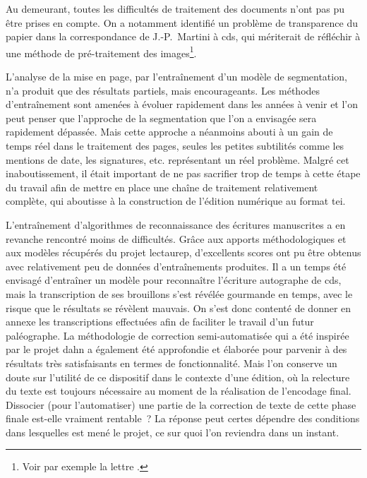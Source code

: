 \documentclass[a4paper,12pt,twoside]{book}
\begin{document}
		Au demeurant, toutes les difficultés de traitement des documents n'ont pas pu être prises en compte. On a notamment identifié un problème de transparence du papier dans la correspondance de J.-P.~Martini à \gls{cds}, qui mériterait de réfléchir à une méthode de pré-traitement des images\footnote{Voir par exemple la lettre \cite{CdS19054056}.}.
		
		L'analyse de la mise en page, par l'entraînement d'un modèle de \gls{segmentation}, n'a produit que des résultats partiels, mais encourageants. Les méthodes d'entraînement sont amenées à évoluer rapidement dans les années à venir et l'on peut penser que l'approche de la \gls{segmentation} que l'on a envisagée sera rapidement dépassée. Mais cette approche a néanmoins abouti à un gain de temps réel dans le traitement des pages, seules les petites subtilités comme les mentions de date, les signatures, etc. représentant un réel problème. Malgré cet inaboutissement, il était important de ne pas sacrifier trop de temps à cette étape du travail afin de mettre en place une chaîne de traitement relativement complète, qui aboutisse à la construction de l'édition numérique au format \gls{tei}.
		
		L'entraînement d'algorithmes de reconnaissance des écritures manuscrites a en revanche rencontré moins de difficultés. Grâce aux apports méthodologiques et aux modèles récupérés du projet \gls{lectaurep}, d'excellents scores ont pu être obtenus avec relativement peu de données d'entraînements produites.
		Il a un temps été envisagé d'entraîner un modèle pour reconnaître l'écriture autographe de \gls{cds}, mais la transcription de ses brouillons s'est révélée gourmande en temps, avec le risque que le résultats se révèlent mauvais. On s'est donc contenté de donner en annexe les transcriptions effectuées afin de faciliter le travail d'un futur paléographe.
		La méthodologie de correction semi-automatisée qui a été inspirée par le projet \gls{dahn} a également été approfondie et élaborée pour parvenir à des résultats très satisfaisants en termes de fonctionnalité. Mais l'on conserve un doute sur l'utilité de ce dispositif dans le contexte d'une édition, où la relecture du texte est toujours nécessaire au moment de la réalisation de l'encodage final. Dissocier (pour l'automatiser) une partie de la correction de texte de cette phase finale est-elle vraiment rentable~? La réponse peut certes dépendre des conditions dans lesquelles est mené le projet, ce sur quoi l'on reviendra dans un instant.
		
\end{document}
